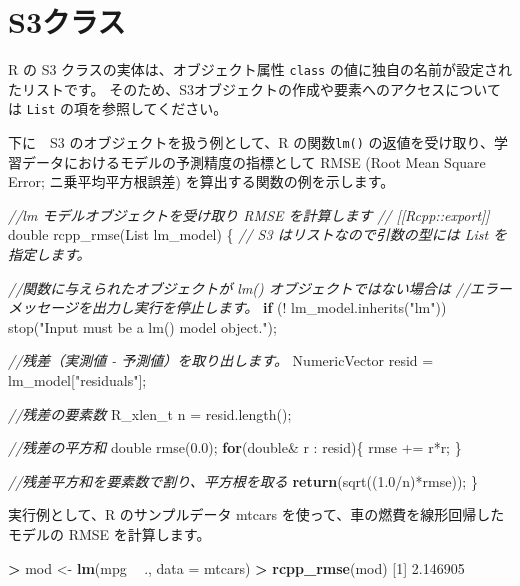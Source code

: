 \documentclass[]{book}
\newenvironment{Shaded}{\begin{snugshade}}{\end{snugshade}}
\newcommand{\CommentTok}[1]{\textcolor[rgb]{0.56,0.35,0.01}{\textit{#1}}}
\newcommand{\ControlFlowTok}[1]{\textcolor[rgb]{0.13,0.29,0.53}{\textbf{#1}}}
\newcommand{\DataTypeTok}[1]{\textcolor[rgb]{0.13,0.29,0.53}{#1}}
\newcommand{\DecValTok}[1]{\textcolor[rgb]{0.00,0.00,0.81}{#1}}
\newcommand{\FloatTok}[1]{\textcolor[rgb]{0.00,0.00,0.81}{#1}}
\newcommand{\KeywordTok}[1]{\textcolor[rgb]{0.13,0.29,0.53}{\textbf{#1}}}
\newcommand{\NormalTok}[1]{#1}
\newcommand{\OperatorTok}[1]{\textcolor[rgb]{0.81,0.36,0.00}{\textbf{#1}}}
\newcommand{\StringTok}[1]{\textcolor[rgb]{0.31,0.60,0.02}{#1}}
\begin{document}
\hypertarget{s3}{%
\section{S3クラス}\label{s3}}

R の S3 クラスの実体は、オブジェクト属性 \texttt{class} の値に独自の名前が設定されたリストです。 そのため、S3オブジェクトの作成や要素へのアクセスについては \texttt{List} の項を参照してください。

下に　S3 のオブジェクトを扱う例として、R の関数\texttt{lm()} の返値を受け取り、学習データにおけるモデルの予測精度の指標として RMSE (Root Mean Square Error; ニ乗平均平方根誤差) を算出する関数の例を示します。

\begin{Shaded}
\begin{Highlighting}[]
\CommentTok{//lm モデルオブジェクトを受け取り RMSE を計算します}
\CommentTok{// [[Rcpp::export]]}
\DataTypeTok{double}\NormalTok{ rcpp_rmse(List lm_model) \{}
    \CommentTok{// S3 はリストなので引数の型には List を指定します。}

    \CommentTok{//関数に与えられたオブジェクトが lm() オブジェクトではない場合は}
    \CommentTok{//エラーメッセージを出力し実行を停止します。}
    \ControlFlowTok{if}\NormalTok{ (! lm_model.inherits(}\StringTok{"lm"}\NormalTok{)) stop(}\StringTok{"Input must be a lm() model object."}\NormalTok{);}

    \CommentTok{//残差（実測値 - 予測値）を取り出します。}
\NormalTok{    NumericVector resid  = lm_model[}\StringTok{"residuals"}\NormalTok{];}

    \CommentTok{//残差の要素数}
    \DataTypeTok{R_xlen_t}\NormalTok{ n = resid.length();}

    \CommentTok{//残差の平方和}
    \DataTypeTok{double}\NormalTok{ rmse(}\FloatTok{0.0}\NormalTok{);}
    \ControlFlowTok{for}\NormalTok{(}\DataTypeTok{double}\NormalTok{& r : resid)\{}
\NormalTok{        rmse += r*r;}
\NormalTok{    \}}

    \CommentTok{//残差平方和を要素数で割り、平方根を取る}
    \ControlFlowTok{return}\NormalTok{(sqrt((}\FloatTok{1.0}\NormalTok{/n)*rmse));}
\NormalTok{\}}
\end{Highlighting}
\end{Shaded}

実行例として、R のサンプルデータ mtcars を使って、車の燃費を線形回帰したモデルの RMSE を計算します。

\begin{Shaded}
\begin{Highlighting}[]
\OperatorTok{>}\StringTok{ }\NormalTok{mod <-}\StringTok{ }\KeywordTok{lm}\NormalTok{(mpg }\OperatorTok{~}\StringTok{ }\NormalTok{., }\DataTypeTok{data =}\NormalTok{ mtcars)}
\OperatorTok{>}\StringTok{ }\KeywordTok{rcpp_rmse}\NormalTok{(mod)}
\NormalTok{[}\DecValTok{1}\NormalTok{] }\FloatTok{2.146905}
\end{Highlighting}
\end{Shaded}
\end{document}

